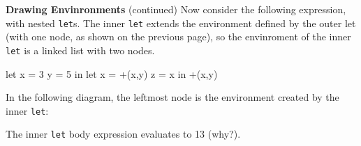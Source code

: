 \begin{minipage}[t]{\sw}
\slidenumber
\LARGE
{\bf Drawing Envinronments} (continued)\exx
Now consider the following expression,
with nested \verb'let's.
The inner \verb'let' extends the environment defined
by the outer let (with one node, as shown on the previous page),
so the envinroment of the inner \verb'let' is a linked
list with two nodes.
\Large
\begin{qv}
let
  x = 3
  y = 5
in
  let
    x = +(x,y) %
    z = x      %
  in
    +(x,y)
\end{qv}
\LARGE
In the following diagram,
the leftmost node is the environment created by the inner \verb'let':\\
\Large
\centerline{}
\LARGE
The inner \verb'let' body expression evaluates to 13 (why?).
\end{minipage}
\clearpage
